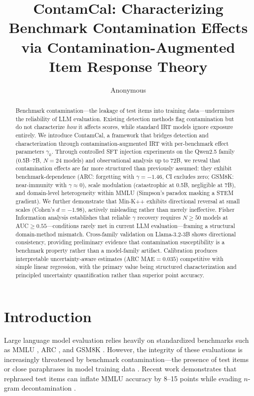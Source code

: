 \documentclass[11pt]{article}
\title{ContamCal: Characterizing Benchmark Contamination Effects\\via Contamination-Augmented Item Response Theory}
\author{Anonymous}
\date{}
\begin{document}
\maketitle

\begin{abstract}
Benchmark contamination---the leakage of test items into training data---undermines the reliability of LLM evaluation. Existing detection methods flag contamination but do not characterize \emph{how} it affects scores, while standard IRT models ignore exposure entirely. We introduce ContamCal, a framework that bridges detection and characterization through contamination-augmented IRT with per-benchmark effect parameters $\gamma_k$. Through controlled SFT injection experiments on the Qwen2.5 family (0.5B--7B, $N{=}24$ models) and observational analysis up to 72B, we reveal that contamination effects are far more structured than previously assumed: they exhibit benchmark-dependence (ARC: forgetting with $\gamma{=}{-}1.46$, CI excludes zero; GSM8K: near-immunity with $\gamma{\approx}0$), scale modulation (catastrophic at 0.5B, negligible at 7B), and domain-level heterogeneity within MMLU (Simpson's paradox masking a STEM gradient). We further demonstrate that Min-K++ exhibits directional reversal at small scales (Cohen's $d{=}{-}1.98$), actively misleading rather than merely ineffective. Fisher Information analysis establishes that reliable $\gamma$ recovery requires $N{\geq}50$ models at AUC${\geq}0.55$---conditions rarely met in current LLM evaluation---framing a structural domain-method mismatch. Cross-family validation on Llama-3.2-3B shows directional consistency, providing preliminary evidence that contamination susceptibility is a benchmark property rather than a model-family artifact. Calibration produces interpretable uncertainty-aware estimates (ARC MAE${=}0.035$) competitive with simple linear regression, with the primary value being structured characterization and principled uncertainty quantification rather than superior point accuracy.
\end{abstract}

\section{Introduction}

Large language model evaluation relies heavily on standardized benchmarks such as MMLU \citep{hendrycks2021measuring}, ARC \citep{clark2018think}, and GSM8K \citep{cobbe2021training}. However, the integrity of these evaluations is increasingly threatened by benchmark contamination---the presence of test items or close paraphrases in model training data \citep{sainz2023nlp,jacovi2023stop}. Recent work demonstrates that rephrased test items can inflate MMLU accuracy by 8--15 points while evading $n$-gram decontamination \citep{yang2023rethinking,oren2024proving}.
\end{document}
